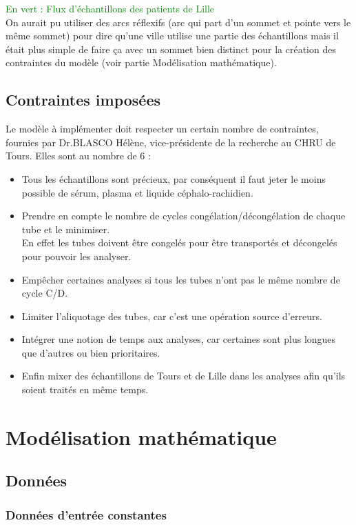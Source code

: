 \documentclass{polytech/polytech}
\numberwithin{figure}{chapter}
\begin{document}
\textcolor{green}{En vert : Flux d'échantillons des patients de Lille}\\

On aurait pu utiliser des arcs réflexifs (arc qui part d'un sommet et pointe vers le même sommet) pour dire qu'une ville utilise une partie des échantillons mais il était plus simple de faire ça avec un sommet bien distinct pour la création des contraintes du modèle (voir partie Modélisation mathématique).

\subsection{Contraintes imposées}
Le modèle à implémenter doit respecter un certain nombre de contraintes, fournies par Dr.BLASCO Hélène, vice-présidente de la recherche au CHRU de Tours.
Elles sont au nombre de 6 :
\begin{itemize}
	\item Tous les échantillons sont précieux, par conséquent il faut jeter le moins possible de sérum, plasma et liquide céphalo-rachidien.
	\item Prendre en compte le nombre de cycles congélation/décongélation de chaque tube et le minimiser. \\En effet les tubes doivent être congelés pour être transportés et décongelés pour pouvoir les analyser.
	\item Empêcher certaines analyses si tous les tubes n'ont pas le même nombre de cycle C/D.
	\item Limiter l'\gls{aliquotage} des tubes, car c'est une opération source d'erreurs.
	\item Intégrer une notion de temps aux analyses, car certaines sont plus longues que d'autres ou bien prioritaires.
	\item Enfin mixer des échantillons de Tours et de Lille dans les analyses afin qu'ils soient traités en même temps.\\

\end{itemize}

\section{Modélisation mathématique}
\subsection{Données}
\subsubsection{Données d'entrée constantes}
\end{document}
